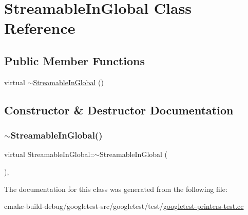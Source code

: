 \hypertarget{classStreamableInGlobal}{}\section{Streamable\+In\+Global Class Reference}
\label{classStreamableInGlobal}
\subsection*{Public Member Functions}
\begin{DoxyCompactItemize}
\item 
virtual \mbox{\hyperlink{classStreamableInGlobal_a20cd7676e22a7a8bbad17c42681d46bf}{$\sim$\+Streamable\+In\+Global}} ()
\end{DoxyCompactItemize}


\subsection{Constructor \& Destructor Documentation}
\mbox{\label{classStreamableInGlobal_a20cd7676e22a7a8bbad17c42681d46bf}} 
\subsubsection{\texorpdfstring{$\sim$StreamableInGlobal()}{~StreamableInGlobal()}}
{\footnotesize\ttfamily virtual Streamable\+In\+Global\+::$\sim$\+Streamable\+In\+Global (\begin{DoxyParamCaption}{ }\end{DoxyParamCaption})\hspace{0.3cm}{\ttfamily [inline]}, {\ttfamily [virtual]}}



The documentation for this class was generated from the following file\+:\begin{DoxyCompactItemize}
\item 
cmake-\/build-\/debug/googletest-\/src/googletest/test/\mbox{\hyperlink{googletest-printers-test_8cc}{googletest-\/printers-\/test.\+cc}}\end{DoxyCompactItemize}
